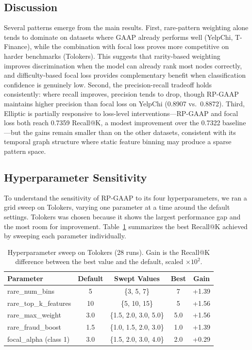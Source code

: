 \subsection{Discussion}

Several patterns emerge from the main results. First, rare-pattern weighting alone tends to dominate on datasets where GAAP already performs well (YelpChi, T-Finance), while the combination with focal loss proves more competitive on harder benchmarks (Tolokers). This suggests that rarity-based weighting improves discrimination when the model can already rank most nodes correctly, and difficulty-based focal loss provides complementary benefit when classification confidence is genuinely low. Second, the precision-recall tradeoff holds consistently: where recall improves, precision tends to drop, though RP-GAAP maintains higher precision than focal loss on YelpChi (0.8907 vs.\ 0.8872). Third, Elliptic is partially responsive to loss-level interventions---RP-GAAP and focal loss both reach 0.7359 Recall@K, a modest improvement over the 0.7322 baseline---but the gains remain smaller than on the other datasets, consistent with its temporal graph structure where static feature binning may produce a sparse pattern space.

\subsection{Hyperparameter Sensitivity}

To understand the sensitivity of RP-GAAP to its four hyperparameters, we ran a grid sweep on Tolokers, varying one parameter at a time around the default settings. Tolokers was chosen because it shows the largest performance gap and the most room for improvement. Table~\ref{tab:sweep} summarizes the best Recall@K achieved by sweeping each parameter individually.

\begin{table}[h]
\centering
\caption{Hyperparameter sweep on Tolokers (28 runs). Gain is the Recall@K difference between the best value and the default, scaled $\times 10^2$.}
\label{tab:sweep}
\begin{tabular}{lcccc}
\toprule
Parameter & Default & Swept Values & Best & Gain \\
\midrule
rare\_num\_bins      & 5   & \{3, 5, 7\}        & 7    & +1.39 \\
rare\_top\_k\_features & 10  & \{5, 10, 15\}      & 5    & +1.56 \\
rare\_max\_weight     & 3.0 & \{1.5, 2.0, 3.0, 5.0\} & 5.0  & +1.56 \\
rare\_fraud\_boost    & 1.5 & \{1.0, 1.5, 2.0, 3.0\} & 1.0  & +1.39 \\
focal\_alpha (class 1) & 3.0 & \{1.5, 2.0, 3.0, 4.0\} & 2.0  & +0.29 \\
\bottomrule
\end{tabular}
\end{table}

